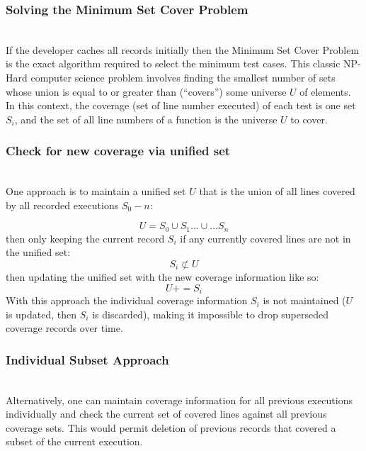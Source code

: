  \subsubsection{Solving the Minimum Set Cover Problem}\label{sec:tuning-2}
 \hfill\\
If the developer caches all records initially then the Minimum Set Cover Problem
\cite{hassin2005better} is the exact algorithm required to select the minimum test cases.
This classic NP-Hard computer science problem involves finding the smallest number
  of sets whose union is equal to or greater than (“covers”) some universe $U$ of elements.  
  In this context, the coverage (set of line number executed) of each test is one set $S_i$,
 and the set of all line numbers of a function is the universe $U$ to cover. 

\subsubsection{Check for new coverage via unified set}\label{sec:tuning-2}
\hfill\\
One approach is to maintain a unified set $U$ that is the union of all lines 
covered by all recorded executions $S_0-n$: 

\begin{equation*}
  U = S_0 \cup S_1 ...\cup... S_n
\end{equation*}
then only keeping the current record $S_i$ if any currently 
covered lines are not in the unified set:
\begin{equation*}
  S_i \not \subset U
\end{equation*}
then updating the unified set with the new coverage information like so:
\begin{equation*}
  U += S_i
\end{equation*} 
With this approach the individual coverage information $S_i$ is not maintained 
($U$ is updated, then $S_i$ is discarded), making it impossible to drop superseded 
coverage records over time.  

\subsubsection{Individual Subset Approach}\label{sec:tuning-2}
\hfill\\
Alternatively, one can maintain coverage information for all previous
 executions individually and check the current set of covered lines
  against all previous coverage sets.  This would permit deletion of 
  previous records that covered a subset of the current execution.  

